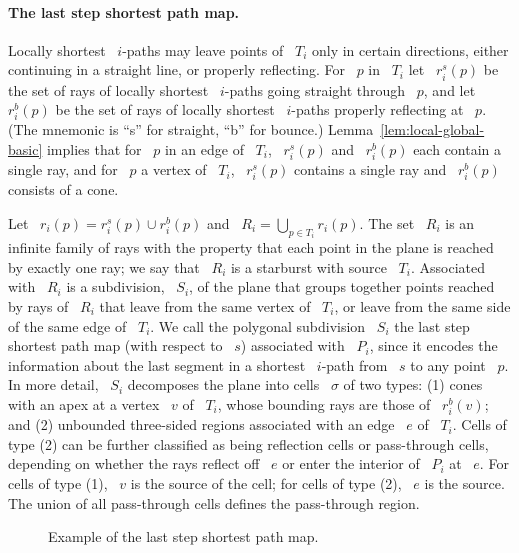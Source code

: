 \documentclass[11pt]{article}
\begin{document}
\paragraph{The last step shortest path map.}
Locally shortest ~\(i\)-paths may leave points of ~\(T_i\) only in certain directions, either continuing in a straight line, or properly reflecting.
For ~\(p\) in ~\(T_i\) let ~\(r_i^s(p)\) be the set of rays of locally shortest ~\(i\)-paths going straight through ~\(p\), and let ~\(r_i^b(p)\) be the set of rays of locally shortest ~\(i\)-paths properly reflecting at ~\(p\).
(The mnemonic is ``s'' for straight, ``b'' for bounce.)
Lemma~\ref{lem:local-global-basic} implies that for ~\(p\) in an edge of ~\(T_i\), ~\(r_i^s(p)\) and ~\(r_i^b(p)\) each contain a single ray, and for ~\(p\) a vertex of ~\(T_i\), ~\(r_i^s(p)\) contains a single ray and ~\(r_i^b(p)\) consists of a cone.

Let ~\(r_i(p) = r_i^s(p) \cup r_i^b(p)\) and ~\(R_i = \bigcup_{p \in T_i} r_i(p)\).
The set ~\(R_i\) is an infinite family of rays with the property that each point in the plane is reached by exactly one ray; we say that ~\(R_i\) is a starburst with source ~\(T_i\).
Associated with ~\(R_i\) is a subdivision, ~\(S_i\), of the plane that groups together points reached by rays of ~\(R_i\) that leave from the same vertex of ~\(T_i\), or leave from the same side of the same edge of ~\(T_i\).
We call the polygonal subdivision ~\(S_i\) the last step shortest path map (with respect to ~\(s\)) associated with ~\(P_i\), since it encodes the information about the last segment in a shortest ~\(i\)-path from ~\(s\) to any point ~\(p\).
In more detail, ~\(S_i\) decomposes the plane into cells ~\(\sigma\) of two types: (1) cones with an apex at a vertex ~\(v\) of ~\(T_i\), whose bounding rays are those of ~\(r_i^b(v)\); and (2) unbounded three-sided regions associated with an edge ~\(e\) of ~\(T_i\).
Cells of type (2) can be further classified as being reflection cells or pass-through cells, depending on whether the rays reflect off ~\(e\) or enter the interior of ~\(P_i\) at ~\(e\).
For cells of type (1), ~\(v\) is the source of the cell; for cells of type (2), ~\(e\) is the source.
The union of all pass-through cells defines the pass-through region.

\begin{figure}[H]
	\centering
	\caption{Example of the last step shortest path map.}
	\label{fig:lastsemap}
\end{figure}
\end{document}
